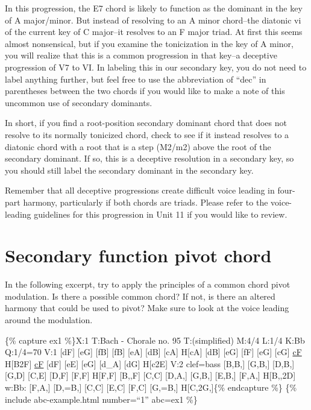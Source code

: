 \documentclass{book}
\begin{document}
In this progression, the E7 chord is likely to function as the dominant in the
key of A major/minor. But instead of resolving to an A minor chord--the
diatonic vi of the current key of C major--it resolves to an F major triad. At
first this seems almost nonsensical, but if you examine the tonicization in
the key of A minor, you will realize that this is a common progression in that
key--a deceptive progression of V7 to VI. In labeling this in our secondary
key, you do not need to label anything further, but feel free to use the
abbreviation of ``dec'' in parentheses between the two chords if you would
like to make a note of this uncommon use of secondary dominants.

In short, if you find a root-position secondary dominant chord that does not
resolve to its normally tonicized chord, check to see if it instead resolves
to a diatonic chord with a root that is a step (M2/m2) above the root of the
secondary dominant. If so, this is a deceptive resolution in a secondary key,
so you should still label the secondary dominant in the secondary key.

Remember that all deceptive progressions create difficult voice leading in
four-part harmony, particularly if both chords are triads. Please refer to the
voice-leading guidelines for this progression in Unit 11 if you would like to
review.

\hypertarget{secondary-function-pivot-chord}{%
\section{Secondary function pivot
chord}\label{secondary-function-pivot-chord}}

In the following excerpt, try to apply the principles of a common chord pivot
modulation. Is there a possible common chord? If not, is there an altered
harmony that could be used to pivot? Make sure to look at the voice leading
around the modulation.

\{\% capture ex1 \%\}X:1 T:Bach - Chorale no. 95 T:(simplified) M:4/4 L:1/4
K:Bb Q:1/4=70 V:1 {[}dF{]} {[}eG{]} {[}fB{]} {[}fB{]}\textbar{} {[}eA{]}
{[}dB{]} {[}cA{]} H{[}cA{]}\textbar{} {[}dB{]} {[}eG{]} {[}fF{]}
{[}eG{]}\textbar{} {[}cG{]} \href{cantusFirmus.html}{cF} H{[}B2F{]}\textbar{}
\href{cantusFirmus.html}{cF} {[}dF{]} {[}eE{]} {[}eG{]}\textbar{} {[}d\_A{]}
{[}dG{]} H{[}c2E{]}\textbar{]} V:2 clef=bass {[}B,B,{]} {[}G,B,{]} {[}D,B,{]}
{[}G,D{]}\textbar{} {[}C,E{]} {[}D,F{]} {[}F,F{]} H{[}F,F{]}\textbar{}
{[}B,,F{]} {[}C,C{]} {[}D,A,{]} {[}G,B,{]}\textbar{} {[}E,B,{]} {[}F,A,{]}
H{[}B,,2D{]}\textbar{} w:Bb: {[}F,A,{]} {[}D,=B,{]} {[}C,C{]}
{[}E,C{]}\textbar{} {[}F,C{]} {[}G,=B,{]} H{[}C,2G,{]}\textbar{]}\{\%
endcapture \%\} \{\% include abc-example.html number=``1'' abc=ex1 \%\}
\end{document}
